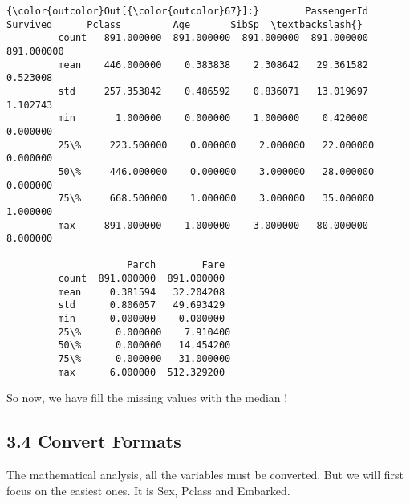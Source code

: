 \documentclass[11pt]{article}
\begin{document}
\begin{Verbatim}[commandchars=\\\{\}]
{\color{outcolor}Out[{\color{outcolor}67}]:}        PassengerId    Survived      Pclass         Age       SibSp  \textbackslash{}
         count   891.000000  891.000000  891.000000  891.000000  891.000000   
         mean    446.000000    0.383838    2.308642   29.361582    0.523008   
         std     257.353842    0.486592    0.836071   13.019697    1.102743   
         min       1.000000    0.000000    1.000000    0.420000    0.000000   
         25\%     223.500000    0.000000    2.000000   22.000000    0.000000   
         50\%     446.000000    0.000000    3.000000   28.000000    0.000000   
         75\%     668.500000    1.000000    3.000000   35.000000    1.000000   
         max     891.000000    1.000000    3.000000   80.000000    8.000000   
         
                     Parch        Fare  
         count  891.000000  891.000000  
         mean     0.381594   32.204208  
         std      0.806057   49.693429  
         min      0.000000    0.000000  
         25\%      0.000000    7.910400  
         50\%      0.000000   14.454200  
         75\%      0.000000   31.000000  
         max      6.000000  512.329200  
\end{Verbatim}
            
    So now, we have fill the missing values with the median !

    \subsection{3.4 Convert Formats}\label{convert-formats}

The mathematical analysis, all the variables must be converted. But we
will first focus on the easiest ones. It is Sex, Pclass and Embarked.
\end{document}
